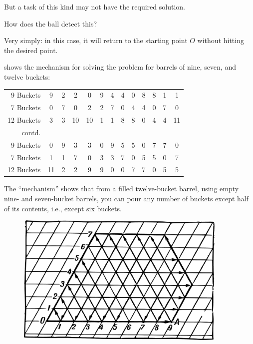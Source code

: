 But a task of this kind may not have the required solution.

How does the ball detect this?

Very simply: in this case, it will return to the starting point $O$ without hitting the desired point.


 shows the mechanism for solving the problem for barrels of nine, seven, and twelve buckets:


\begin{small}
\centering
\begin{center}
\begin{tabular}{@{}r *{12}{c}@{}}
\toprule
9 Buckets & 9  & 2 & 2 & 0 & 9 & 4 & 4 & 0 & 8 & 8 & 1 & 1 \\
7 Buckets & 0 & 7 & 0 & 2 & 2 & 7 & 0 & 4 & 4 & 0 & 7 & 0 \\
12 Buckets & 3 & 3 & 10 & 10 & 1 & 1 & 8  & 8 & 0 & 4 & 4  & 11 \\
\midrule
contd.\\
9 Buckets & 0 & 9 & 3 & 3 & 0 & 9 & 5 & 5 & 0 & 7 & 7 & 0 \\
7 Buckets & 1 & 1 & 7 & 0 & 3 & 3 & 7 & 0 & 5 & 5 & 0 & 7\\
12 Buckets & 11 & 2 & 2 & 9 & 9 & 0 & 0  & 7 & 7 & 0 & 5 & 5\\ 
\bottomrule
\end{tabular}
\end{center}
\end{small}


The ``mechanism'' shows that from a filled twelve-bucket barrel, using empty nine- and seven-bucket barrels, you can pour any number of buckets except half of its contents, i.e., except six buckets.


\begin{figure}[h!]
\centering
\includegraphics[width=0.9\textwidth]{figures/ch-10/fig-153.pdf}
\end{figure}

